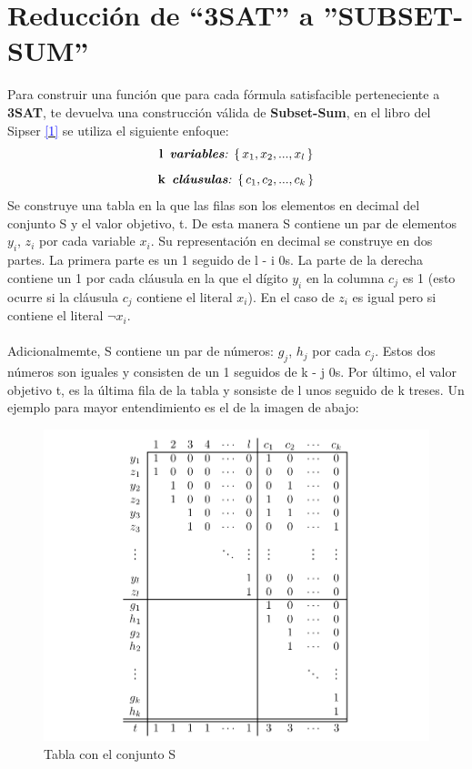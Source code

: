 \documentclass[../main]{subfiles}
\begin{document}
\section{Reducción de ``3SAT'' a ''SUBSET-SUM''}
Para construir una función que para cada fórmula satisfacible perteneciente a \textbf{3SAT}, te devuelva una construcción válida de \textbf{Subset-Sum}, en el libro del Sipser \hyperlink{target:zona}{\textcolor{blue}{[1]}} se utiliza el siguiente enfoque: 
\begin{equation*}
    \textbf{l} \, \text{\textit{ \textbf{variables}: }} \{\, x_1, x_2, ..., x_l \, \}
\end{equation*}
\begin{equation*}
    \textbf{k} \, \text{\textit{ \textbf{cláusulas}: }} \{\, c_1, c_2, ..., c_k \, \}
\end{equation*}
Se construye una tabla en la que las filas son los elementos en decimal del conjunto S y el valor objetivo, t. De esta manera S contiene un par de elementos $y_i$, $z_i$ por cada variable $x_i$. Su representación en decimal se construye en dos partes. La primera parte es un 1 seguido de l - i 0s. La parte de la derecha contiene un 1 por cada cláusula en la que el dígito $y_i$ en la columna $c_j$ es 1 (esto ocurre si la cláusula $c_j$ contiene el literal $x_i$). En el caso de $z_i$ es igual pero si contiene el literal $\neg x_i$. \\\\  Adicionalmemte, S contiene un par de números: $g_j$, $h_j$ por cada $c_j$. Estos dos números son iguales y consisten de un 1 seguidos de k - j 0s. Por último, el valor objetivo t, es la última fila de la tabla y sonsiste de l unos seguido de k treses. Un ejemplo para mayor entendimiento es el de la imagen de abajo:
\begin{figure}[H]
  \centering
  \includegraphics[width=1\textwidth]{./figures/tabla}
  \caption{Tabla con el conjunto S}
  \label{fig:imagen}
\end{figure}
\end{document}
